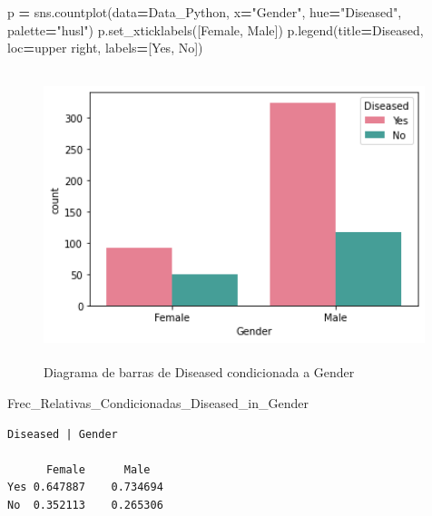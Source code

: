 \documentclass[
  11pt,
  a4paper,
]{article}
\newenvironment{Shaded}{\begin{snugshade}}{\end{snugshade}}
\newcommand{\NormalTok}[1]{#1}
\newcommand{\OperatorTok}[1]{\textcolor[rgb]{0.81,0.36,0.00}{\textbf{#1}}}
\newcommand{\StringTok}[1]{\textcolor[rgb]{0.31,0.60,0.02}{#1}}
\begin{document}
\begin{Shaded}
\begin{Highlighting}[]
\NormalTok{p }\OperatorTok{=}\NormalTok{ sns.countplot(data}\OperatorTok{=}\NormalTok{Data\_Python, x}\OperatorTok{=}\StringTok{"Gender"}\NormalTok{, hue}\OperatorTok{=}\StringTok{"Diseased"}\NormalTok{, palette}\OperatorTok{=}\StringTok{"husl"}\NormalTok{)}
\NormalTok{p.set\_xticklabels([}\StringTok{\textquotesingle{}Female\textquotesingle{}}\NormalTok{, }\StringTok{\textquotesingle{}Male\textquotesingle{}}\NormalTok{])}
\NormalTok{p.legend(title}\OperatorTok{=}\StringTok{\textquotesingle{}Diseased\textquotesingle{}}\NormalTok{, loc}\OperatorTok{=}\StringTok{\textquotesingle{}upper right\textquotesingle{}}\NormalTok{, labels}\OperatorTok{=}\NormalTok{[}\StringTok{\textquotesingle{}Yes\textquotesingle{}}\NormalTok{, }\StringTok{\textquotesingle{}No\textquotesingle{}}\NormalTok{])}
\end{Highlighting}
\end{Shaded}

\begin{figure}
\centering
\includegraphics[width=4.375in,height=3.33333in]{output_162_1.png}
\caption{Diagrama de barras de Diseased condicionada a Gender}
\end{figure}

\begin{Shaded}
\begin{Highlighting}[]
\NormalTok{Frec\_Relativas\_Condicionadas\_Diseased\_in\_Gender}
\end{Highlighting}
\end{Shaded}

\begin{verbatim}
Diseased | Gender
    
      Female      Male
Yes 0.647887    0.734694
No  0.352113    0.265306
\end{verbatim}
\end{document}
